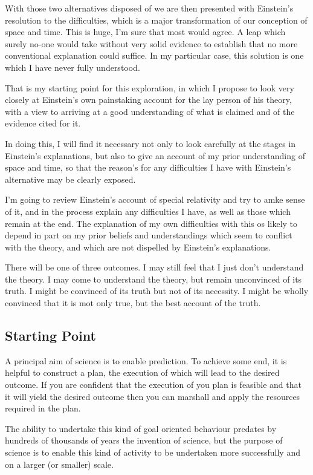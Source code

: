 \documentclass[10pt,titlepage]{book}
\begin{document}
With those two alternatives disposed of we are then presented with Einstein's resolution to the difficulties, which is a major transformation of our conception of space and time.
This is huge, I'm sure that most would agree.
A leap which surely no-one would take without very solid evidence to establish that no more conventional explanation could suffice.
In my particular case, this solution is one which I have never fully understood.

That is my starting point for this exploration, in which I propose to look very closely at Einstein's own painstaking account for the lay person of his theory, with a view to arriving at a good understanding of what is claimed and of the evidence cited for it.

In doing this, I will find it necessary not only to look carefully at the stages in Einstein's explanations, but also to give an account of my prior understanding of space and time, so that the reason's for any difficulties I have with Einstein's alternative may be clearly exposed.

I'm going to review Einstein's account of special relativity and try to amke sense of it, and in the process explain any difficulties I have, as well as those which remain at the end.
The explanation of my own difficulties with this os likely to depend in part on my prior beliefs and understandings which seem to conflict with the theory, and which are not dispelled by Einstein's explanations.

There will be one of three outcomes.
I may still feel that I just don't understand the theory.
I may come to understand the theory, but remain unconvinced of its truth.
I might be convinced of its truth but not of its necessity.
I might be wholly convinced that it is mot only true, but the best account of the truth.

\subsection{Starting Point}

A principal aim of science is to enable prediction.
To achieve some end, it is helpful to construct a plan, the execution of which will lead to the desired outcome.
If you are confident that the execution of you plan is feasible and that it will yield the desired outcome then you can marshall and apply the resources required in the plan.

The ability to undertake this kind of goal oriented behaviour predates by hundreds of thousands of years the invention of science, but the purpose of science is to enable this kind of activity to be undertaken more successfully and on a larger (or smaller) scale.
\end{document}
